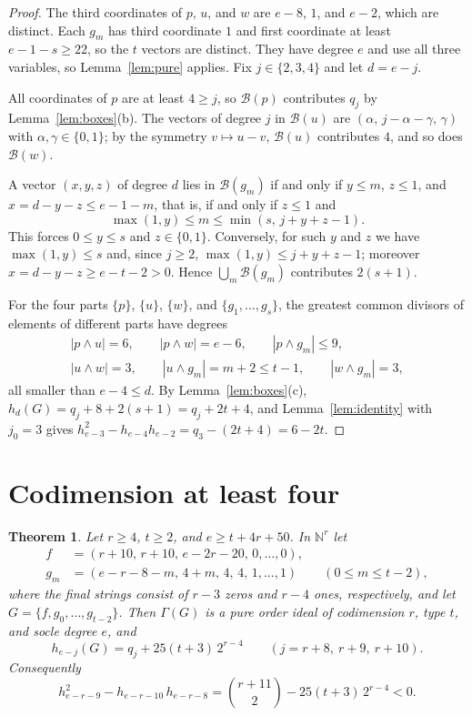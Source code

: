 \documentclass{amsart}
\newtheorem{theorem}{Theorem}[section]
\theoremstyle{definition}
\theoremstyle{remark}
\newcommand{\N}{\mathbb{N}}
\newcommand{\B}{\mathcal{B}}
\begin{document}
\begin{proof}
The third coordinates of $p$, $u$, and $w$ are $e-8$, $1$, and $e-2$, which are distinct. Each $g_m$ has third coordinate $1$ and first coordinate at least $e-1-s\ge 22$, so the $t$ vectors are distinct. They have degree $e$ and use all three variables, so Lemma~\ref{lem:pure} applies. Fix $j\in\{2,3,4\}$ and let $d=e-j$.

All coordinates of $p$ are at least $4\ge j$, so $\B(p)$ contributes $q_j$ by Lemma~\ref{lem:boxes}(b). The vectors of degree $j$ in $\B(u)$ are $(\alpha,\,j-\alpha-\gamma,\,\gamma)$ with $\alpha,\gamma\in\{0,1\}$; by the symmetry $v\mapsto u-v$, $\B(u)$ contributes $4$, and so does $\B(w)$.

A vector $(x,y,z)$ of degree $d$ lies in $\B(g_m)$ if and only if $y\le m$, $z\le 1$, and $x=d-y-z\le e-1-m$, that is, if and only if $z\le 1$ and
\[
\max(1,y)\le m\le\min(s,\,j+y+z-1).
\]
This forces $0\le y\le s$ and $z\in\{0,1\}$. Conversely, for such $y$ and $z$ we have $\max(1,y)\le s$ and, since $j\ge 2$, $\max(1,y)\le j+y+z-1$; moreover $x=d-y-z\ge e-t-2>0$. Hence $\bigcup_m\B(g_m)$ contributes $2(s+1)$.

For the four parts $\{p\}$, $\{u\}$, $\{w\}$, and $\{g_1,\dots,g_s\}$, the greatest common divisors of elements of different parts have degrees
\[
\begin{gathered}
|p\wedge u|=6,\qquad |p\wedge w|=e-6,\qquad |p\wedge g_m|\le 9,\\
|u\wedge w|=3,\qquad |u\wedge g_m|=m+2\le t-1,\qquad |w\wedge g_m|=3,
\end{gathered}
\]
all smaller than $e-4\le d$. By Lemma~\ref{lem:boxes}(c), $h_d(G)=q_j+8+2(s+1)=q_j+2t+4$, and Lemma~\ref{lem:identity} with $j_0=3$ gives $h_{e-3}^2-h_{e-4}h_{e-2}=q_3-(2t+4)=6-2t$.
\end{proof}

\section{Codimension at least four}\label{sec:higher}

\begin{theorem}\label{thm:higher}
Let $r\ge 4$, $t\ge 2$, and $e\ge t+4r+50$. In $\N^r$ let
\begin{align*}
f&=(r+10,\,r+10,\,e-2r-20,\,0,\dots,0),\\
g_m&=(e-r-8-m,\,4+m,\,4,\,4,\,1,\dots,1)\qquad (0\le m\le t-2),
\end{align*}
where the final strings consist of $r-3$ zeros and $r-4$ ones, respectively, and let $G=\{f,g_0,\dots,g_{t-2}\}$. Then $\Gamma(G)$ is a pure order ideal of codimension $r$, type $t$, and socle degree $e$, and
\[
h_{e-j}(G)=q_j+25(t+3)\,2^{r-4}\qquad (j=r+8,\ r+9,\ r+10).
\]
Consequently
\[
h_{e-r-9}^2-h_{e-r-10}\,h_{e-r-8}=\binom{r+11}{2}-25(t+3)\,2^{r-4}<0.
\]
\end{theorem}
\end{document}
